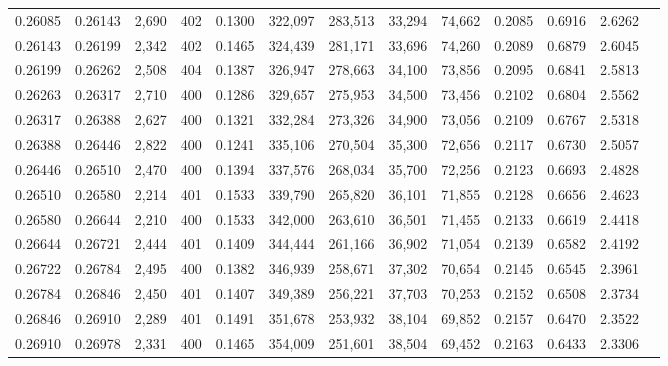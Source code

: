 \begin{tabular}{rrrrrrrrrrrrr}
0.26085 & 0.26143 &  2,690 & 402 &                                     0.1300 & 322,097 & 283,513 &  33,294 &  74,662 & 0.2085 & 0.6916 & 2.6262 \\
0.26143 & 0.26199 &  2,342 & 402 &                                     0.1465 & 324,439 & 281,171 &  33,696 &  74,260 & 0.2089 & 0.6879 & 2.6045 \\
0.26199 & 0.26262 &  2,508 & 404 &                                     0.1387 & 326,947 & 278,663 &  34,100 &  73,856 & 0.2095 & 0.6841 & 2.5813 \\
0.26263 & 0.26317 &  2,710 & 400 &                                     0.1286 & 329,657 & 275,953 &  34,500 &  73,456 & 0.2102 & 0.6804 & 2.5562 \\
0.26317 & 0.26388 &  2,627 & 400 &                                     0.1321 & 332,284 & 273,326 &  34,900 &  73,056 & 0.2109 & 0.6767 & 2.5318 \\
0.26388 & 0.26446 &  2,822 & 400 &                                     0.1241 & 335,106 & 270,504 &  35,300 &  72,656 & 0.2117 & 0.6730 & 2.5057 \\
0.26446 & 0.26510 &  2,470 & 400 &                                     0.1394 & 337,576 & 268,034 &  35,700 &  72,256 & 0.2123 & 0.6693 & 2.4828 \\
0.26510 & 0.26580 &  2,214 & 401 &                                     0.1533 & 339,790 & 265,820 &  36,101 &  71,855 & 0.2128 & 0.6656 & 2.4623 \\
0.26580 & 0.26644 &  2,210 & 400 &                                     0.1533 & 342,000 & 263,610 &  36,501 &  71,455 & 0.2133 & 0.6619 & 2.4418 \\
0.26644 & 0.26721 &  2,444 & 401 &                                     0.1409 & 344,444 & 261,166 &  36,902 &  71,054 & 0.2139 & 0.6582 & 2.4192 \\
0.26722 & 0.26784 &  2,495 & 400 &                                     0.1382 & 346,939 & 258,671 &  37,302 &  70,654 & 0.2145 & 0.6545 & 2.3961 \\
0.26784 & 0.26846 &  2,450 & 401 &                                     0.1407 & 349,389 & 256,221 &  37,703 &  70,253 & 0.2152 & 0.6508 & 2.3734 \\
0.26846 & 0.26910 &  2,289 & 401 &                                     0.1491 & 351,678 & 253,932 &  38,104 &  69,852 & 0.2157 & 0.6470 & 2.3522 \\
0.26910 & 0.26978 &  2,331 & 400 &                                     0.1465 & 354,009 & 251,601 &  38,504 &  69,452 & 0.2163 & 0.6433 & 2.3306 \\

\end{tabular}
